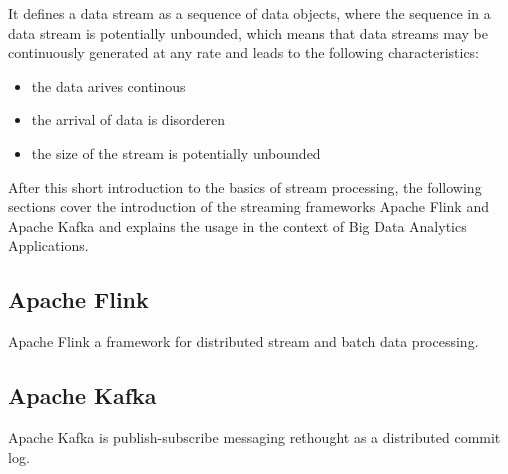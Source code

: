 It defines a data stream as a sequence of data objects, where the sequence in a data stream
is potentially unbounded, which means that data streams may be continuously generated
at any rate \cite{Nam15} and leads to the following characteristics:
\begin{itemize}
	\item the data arives continous
	\item the arrival of data is disorderen
	\item the size of the stream is potentially unbounded
\end{itemize}

After this short introduction to the basics of stream processing, the following sections
cover the introduction of the streaming frameworks Apache Flink and Apache Kafka and explains
the usage in the context of Big Data Analytics Applications.
\subsection{Apache Flink}

Apache Flink a framework for distributed stream and batch data processing. \cite{Flink16}

\subsection{Apache Kafka}

Apache Kafka is publish-subscribe messaging rethought as a distributed commit log. \cite{Kafka16}

%
%
%
%

